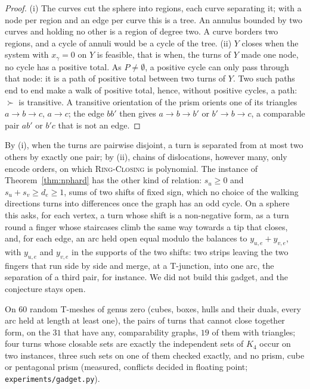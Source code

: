 \documentclass[11pt,a4paper]{article}
\newcommand{\shift}{s}
\newcommand{\RC}{\textup{\textsc{Ring-Closing}}}
\begin{document}
\begin{proof}
(i) The curves cut the sphere into regions, each curve separating it; with a
node per region and an edge per curve this is a tree. An annulus bounded by
two curves and holding no other is a region of degree two. A curve borders two
regions, and a cycle of annuli would be a cycle of the tree. (ii) $Y$ closes
when the system with $x_\gamma = 0$ on $Y$ is feasible, that is when, the turns
of $Y$ made one node, no cycle has a positive total. As $P \ne \emptyset$, a
positive cycle can only pass through that node: it is a path of positive total
between two turns of $Y$. Two such paths end to end make a walk of positive
total, hence, without positive cycles, a path: $\succ$ is transitive. A
transitive orientation of the prism orients one of its triangles $a \to b \to
c$, $a \to c$; the edge $bb'$ then gives $a \to b \to b'$ or $b' \to b \to c$,
a comparable pair $ab'$ or $b'c$ that is not an edge.
\end{proof}

By (i), when the turns are pairwise disjoint, a turn is separated from at most
two others by exactly one pair; by (ii), chains of dislocations, however many, only encode orders, on which
\RC{} is polynomial. The instance of Theorem~\ref{thm:nphard} has the other
kind of relation: $\shift_u \ge 0$ and $\shift_u + \shift_v \ge d_e \ge 1$,
sums of two shifts of fixed sign, which no choice of the walking directions
turns into differences once the graph has an odd cycle. On a sphere this asks,
for each vertex, a turn whose shift is a non-negative form, as a turn round a
finger whose staircases climb the same way towards a tip that closes, and,
for each edge, an arc held open equal modulo the balances to $y_{u,e} +
y_{v,e}$, with $y_{u,e}$ and $y_{v,e}$ in the supports of the two shifts: two
strips leaving the two fingers that run side by side and merge, at a
T-junction, into one arc, the separation of a third pair, for instance. We did
not build this gadget, and the conjecture stays open.

On $60$ random T-meshes of genus zero (cubes, boxes, hulls and their duals,
every arc held at length at least one), the pairs of turns that cannot close
together form, on the $31$ that have any, comparability graphs, $19$ of them
with triangles; four turns whose closable sets are exactly the independent
sets of $K_4$ occur on two instances, three such sets on one of them checked
exactly, and no prism, cube or pentagonal prism (measured, conflicts decided in floating point;
\texttt{experiments/gadget.py}).
\end{document}
